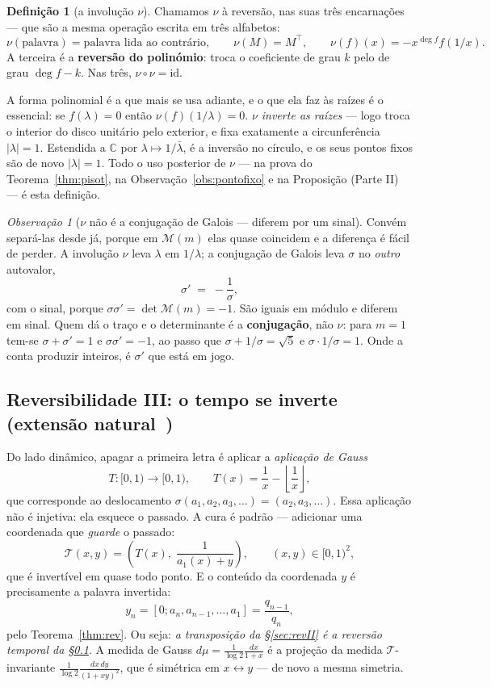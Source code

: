 \documentclass[11pt,a4paper]{article}
\theoremstyle{plain}
\theoremstyle{definition}
\newtheorem{definicao}[teorema]{Definição}
\theoremstyle{remark}
\newtheorem{obs}[teorema]{Observação}
\newcommand{\C}{\mathbb{C}}
\newcommand{\Mat}[1]{\mathcal{M}(#1)}
\newcommand{\cf}[2]{[#1;#2]}
\begin{document}
\begin{definicao}[a involução $\nu$]\label{def:nu}
Chamamos $\nu$ à reversão, nas suas três encarnações --- que são a mesma operação escrita em três
alfabetos:
\[
  \nu(\text{palavra}) = \text{palavra lida ao contrário},\qquad
  \nu(M) = M^{\!\top},\qquad
  \nu(f)(x) = -x^{\deg f} f(1/x) .
\]
A terceira é a \textbf{reversão do polinómio}: troca o coeficiente de grau $k$ pelo de grau
$\deg f - k$. Nas três, $\nu\circ\nu = \mathrm{id}$.
\end{definicao}

\noindent A forma polinomial é a que mais se usa adiante, e o que ela faz às raízes é o essencial:
se $f(\lambda) = 0$ então $\nu(f)(1/\lambda) = 0$. \emph{$\nu$ inverte as raízes} --- logo troca o
interior do disco unitário pelo exterior, e fixa exatamente a circunferência $|\lambda| = 1$.
Estendida a $\C$ por $\lambda\mapsto1/\bar\lambda$, é a inversão no círculo, e os seus pontos fixos
são de novo $|\lambda|=1$. Todo o uso posterior de $\nu$ --- na prova do Teorema~\ref{thm:pisot},
na Observação~\ref{obs:pontofixo} e na Proposição (Parte II) --- é esta definição.

\begin{obs}[$\nu$ não é a conjugação de Galois --- diferem por um sinal]\label{obs:nugalois}
Convém separá-las desde já, porque em $\Mat{m}$ elas quase coincidem e a diferença é fácil de
perder. A involução $\nu$ leva $\lambda$ em $1/\lambda$; a conjugação de Galois leva $\sigma$ no
\emph{outro} autovalor,
\[
  \sigma' \;=\; -\frac{1}{\sigma} ,
\]
com o sinal, porque $\sigma\sigma' = \det\Mat{m} = -1$. São iguais em módulo e diferem em sinal.
Quem dá o traço e o determinante é a \textbf{conjugação}, não $\nu$: para $m=1$ tem-se
$\sigma+\sigma' = 1$ e $\sigma\sigma' = -1$, ao passo que $\sigma + 1/\sigma = \sqrt5$ e
$\sigma\cdot 1/\sigma = 1$. Onde a conta produzir inteiros, é $\sigma'$ que está em jogo.
\end{obs}

\subsection{Reversibilidade III: o tempo se inverte (extensão natural~\cite{nakada1981})}\label{sec:revIII}

Do lado dinâmico, apagar a primeira letra é aplicar a \emph{aplicação de Gauss}
\[
  T:[0,1)\to[0,1), \qquad T(x) = \frac{1}{x} - \left\lfloor \frac{1}{x}\right\rfloor,
\]
que corresponde ao deslocamento $\sigma(a_1,a_2,a_3,\dots) = (a_2,a_3,\dots)$. Essa aplicação
não é injetiva: ela esquece o passado. A cura é padrão --- adicionar uma coordenada que
\emph{guarde} o passado:
\[
  \mathcal{T}(x,y) = \left( T(x),\; \frac{1}{a_1(x)+y}\right), \qquad (x,y)\in[0,1)^2,
\]
que é invertível em quase todo ponto. E o conteúdo da coordenada $y$ é precisamente a palavra
invertida:
\[
  y_n = \cf{0}{a_n,a_{n-1},\dots,a_1} = \frac{q_{n-1}}{q_n},
\]
pelo Teorema~\ref{thm:rev}. Ou seja: \emph{a transposição da \S\ref{sec:revII} é a reversão
temporal da \S\ref{sec:revIII}}. A medida de Gauss $d\mu = \frac{1}{\log 2}\frac{dx}{1+x}$ é a projeção da medida
$\mathcal{T}$-invariante $\frac{1}{\log 2}\frac{dx\,dy}{(1+xy)^2}$, que é simétrica em $x
\leftrightarrow y$ --- de novo a mesma simetria.
\end{document}
